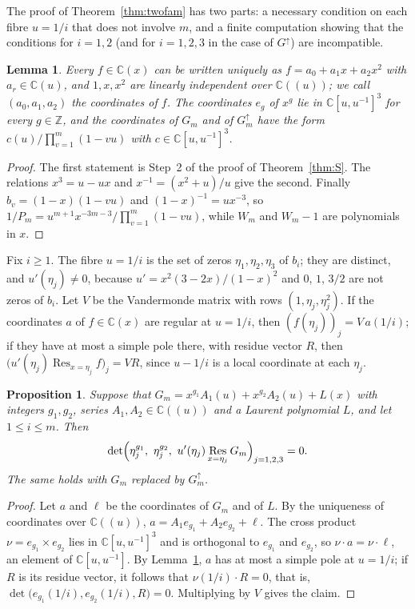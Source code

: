 \documentclass[11pt]{amsart}
\newtheorem{proposition}[theorem]{Proposition}
\newtheorem{lemma}[theorem]{Lemma}
\theoremstyle{definition}
\newcommand{\C}{\mathbb{C}}
\newcommand{\Z}{\mathbb{Z}}
\DeclareMathOperator{\Res}{Res}
\begin{document}
The proof of Theorem~\ref{thm:twofam} has two parts: a necessary condition on each fibre $u=1/i$ that does not involve $m$, and a finite computation showing that the conditions for $i=1,2$ (and for $i=1,2,3$ in the case of $G^{\uparrow}$) are incompatible.

\begin{lemma}\label{lem:coords}
Every $f\in\C(x)$ can be written uniquely as $f=a_0+a_1x+a_2x^2$ with $a_r\in\C(u)$, and $1,x,x^2$ are linearly independent over $\C((u))$; we call $(a_0,a_1,a_2)$ the coordinates of $f$. The coordinates $e_g$ of $x^g$ lie in $\C[u,u^{-1}]^3$ for every $g\in\Z$, and the coordinates of $G_m$ and of $G^{\uparrow}_m$ have the form $c(u)/\prod_{v=1}^{m}(1-vu)$ with $c\in\C[u,u^{-1}]^3$.
\end{lemma}

\begin{proof}
The first statement is Step~2 of the proof of Theorem~\ref{thm:S}. The relations $x^3=u-ux$ and $x^{-1}=(x^2+u)/u$ give the second. Finally $b_v=(1-x)(1-vu)$ and $(1-x)^{-1}=ux^{-3}$, so $1/P_m=u^{m+1}x^{-3m-3}/\prod_{v=1}^{m}(1-vu)$, while $W_m$ and $W_m-1$ are polynomials in $x$.
\end{proof}

Fix $i\ge1$. The fibre $u=1/i$ is the set of zeros $\eta_1,\eta_2,\eta_3$ of $b_i$; they are distinct, and $u'(\eta_j)\ne0$, because $u'=x^2(3-2x)/(1-x)^2$ and $0$, $1$, $3/2$ are not zeros of $b_i$. Let $V$ be the Vandermonde matrix with rows $(1,\eta_j,\eta_j^2)$. If the coordinates $a$ of $f\in\C(x)$ are regular at $u=1/i$, then $(f(\eta_j))_j=V\,a(1/i)$; if they have at most a simple pole there, with residue vector $R$, then $\bigl(u'(\eta_j)\Res_{x=\eta_j}f\bigr)_j=VR$, since $u-1/i$ is a local coordinate at each $\eta_j$.

\begin{proposition}\label{prop:fibrecond}
Suppose that $G_m=x^{g_1}A_1(u)+x^{g_2}A_2(u)+L(x)$ with integers $g_1,g_2$, series $A_1,A_2\in\C((u))$ and a Laurent polynomial $L$, and let $1\le i\le m$. Then
\[
  \det\Bigl(\eta_j^{g_1},\ \eta_j^{g_2},\ u'(\eta_j)\Res_{x=\eta_j}G_m\Bigr)_{j=1,2,3}=0 .
\]
The same holds with $G_m$ replaced by $G^{\uparrow}_m$.
\end{proposition}

\begin{proof}
Let $a$ and $\ell$ be the coordinates of $G_m$ and of $L$. By the uniqueness of coordinates over $\C((u))$, $a=A_1e_{g_1}+A_2e_{g_2}+\ell$. The cross product $\nu=e_{g_1}\times e_{g_2}$ lies in $\C[u,u^{-1}]^3$ and is orthogonal to $e_{g_1}$ and $e_{g_2}$, so $\nu\cdot a=\nu\cdot\ell$, an element of $\C[u,u^{-1}]$. By Lemma~\ref{lem:coords}, $a$ has at most a simple pole at $u=1/i$; if $R$ is its residue vector, it follows that $\nu(1/i)\cdot R=0$, that is, $\det\bigl(e_{g_1}(1/i),e_{g_2}(1/i),R\bigr)=0$. Multiplying by $V$ gives the claim.
\end{proof}
\end{document}
